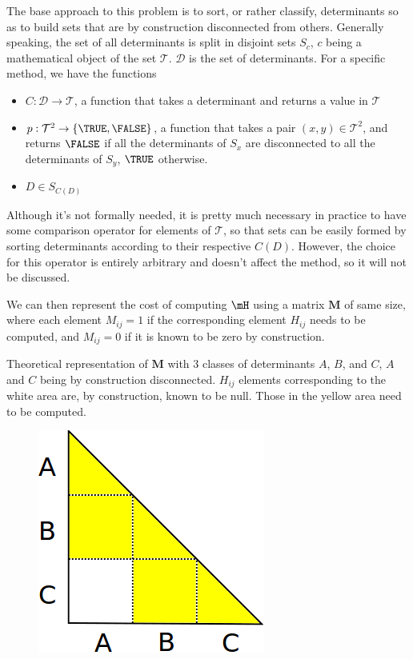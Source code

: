 The base approach to this problem is to sort, or rather classify, determinants so as to build sets that are by construction disconnected from others. Generally speaking, the set of all determinants is split in disjoint sets $S_c$, $c$ being a mathematical object of the set $\mathcal{T}$. $\mathcal{D}$ is the set of determinants. For a specific method, we have the functions
\begin{itemize}
	\item
	$C : \mathcal{D} \rightarrow \mathcal{T}$, a function that takes a determinant and returns a value in $\mathcal{T}$
	\item
	$p : \mathcal{T}^2 \rightarrow \{ \TRUE, \FALSE \}$, a function that takes a pair $(x,y) \in \mathcal{T}^2$, and returns $\FALSE$ if all the determinants of $S_x$ are disconnected to all the determinants of $S_y$, $\TRUE$ otherwise.
	\item
	$D \in S_{C(D)}$
\end{itemize}  


Although it's not formally needed, it is pretty much necessary in practice to have some comparison operator for elements of $\mathcal{T}$, so that sets can be easily formed by sorting determinants according to their respective $C(D)$. However, the choice for this operator is entirely arbitrary and doesn't affect the method, so it will not be discussed.
    
    
We can then represent the cost of computing $\mH$ using a matrix $\mathbf{M}$ of same size, where each element $M_{ij}=1$ if the corresponding element $H_{ij}$ needs to be computed, and $M_{ij}=0$ if it is known to be zero by construction.

\alert{
Theoretical representation of $\mathbf{M}$ with 3 classes of determinants $A$, $B$, and $C$, $A$ and $C$ being by construction disconnected. $H_{ij}$ elements corresponding to the white area are, by construction, known to be null. Those in the yellow area need to be computed.
}
    
\begin{figure}[h!]
	\begin{center}
		\includegraphics[width=0.4\columnwidth]{figures/davidson/disconnected_classes}
		\caption{{\label{generators_selectors}
		}}
	\end{center}
\end{figure}

